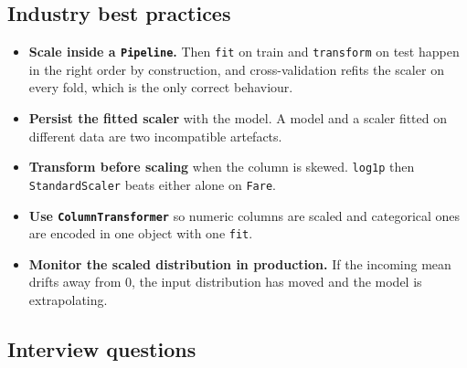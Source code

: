 \documentclass[11pt,a4paper]{article}
\begin{document}
\subsection*{Industry best practices}

\begin{itemize}\itemsep3pt
  \item \textbf{Scale inside a \lstinline|Pipeline|.} Then \lstinline|fit| on train and
        \lstinline|transform| on test happen in the right order by construction, and
        cross-validation refits the scaler on every fold, which is the only correct
        behaviour.
  \item \textbf{Persist the fitted scaler} with the model. A model and a scaler fitted on
        different data are two incompatible artefacts.
  \item \textbf{Transform before scaling} when the column is skewed. \lstinline|log1p| then
        \lstinline|StandardScaler| beats either alone on \texttt{Fare}.
  \item \textbf{Use \lstinline|ColumnTransformer|} so numeric columns are scaled and
        categorical ones are encoded in one object with one \lstinline|fit|.
  \item \textbf{Monitor the scaled distribution in production.} If the incoming mean drifts
        away from 0, the input distribution has moved and the model is extrapolating.
\end{itemize}

\subsection*{Interview questions}
\end{document}
